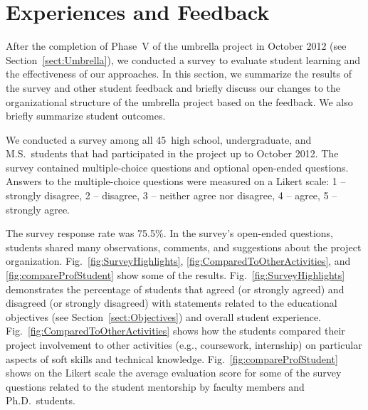 \documentclass[journal,twopages]{IEEEtran}
\newcommand{\makered}[1]{\color{black}#1\color{black}}
\begin{document}
\iffalse
\begin{itemize}
\item Lesson learned: Masters students supervising undergraduate students/ other masters students does not work out. Not a single successful case. Examples: Dongzhen, Paul, Sonal, Gerald allowed to manage other students -- all failures.
\end{itemize}
\fi
 
\section{Experiences and Feedback}
\label{sect:Assessment}




After the completion of Phase~V of the umbrella project in October 2012 (see Section~\ref{sect:Umbrella}), we conducted a survey to evaluate student learning and the effectiveness of our approaches. In this section, we summarize the results of the survey and other student feedback and briefly discuss our changes to the organizational structure of the umbrella project based on the feedback. We also briefly summarize student outcomes.

We conducted a survey among all 45~high school, undergraduate, and M.S.~students that had participated in the project up to October 2012. The survey contained multiple-choice questions and optional open-ended questions. Answers to the multiple-choice questions were measured on a Likert scale:
1 -- strongly disagree, 2 -- disagree, 3 -- neither agree nor disagree, 4 -- agree, 5 -- strongly agree.

The survey response rate was 75.5\%.
In the survey's open-ended questions, students shared many observations, comments, and suggestions about the project organization. Fig.~\ref{fig:SurveyHighlights}, \ref{fig:ComparedToOtherActivities}, and \ref{fig:compareProfStudent} show some of the results.
\makered{Fig.~\ref{fig:SurveyHighlights} demonstrates the percentage of students that agreed (or strongly agreed) and disagreed (or strongly disagreed) with statements related to the educational objectives (see Section~\ref{sect:Objectives}) and overall student experience. Fig.~\ref{fig:ComparedToOtherActivities} shows how the students compared their project involvement to other activities (e.g., coursework, internship)
on particular aspects of soft skills and technical knowledge. Fig.~\ref{fig:compareProfStudent} shows on the Likert scale the average evaluation score for some of the survey questions related to the student mentorship by faculty members and Ph.D.\ students.}
\end{document}
